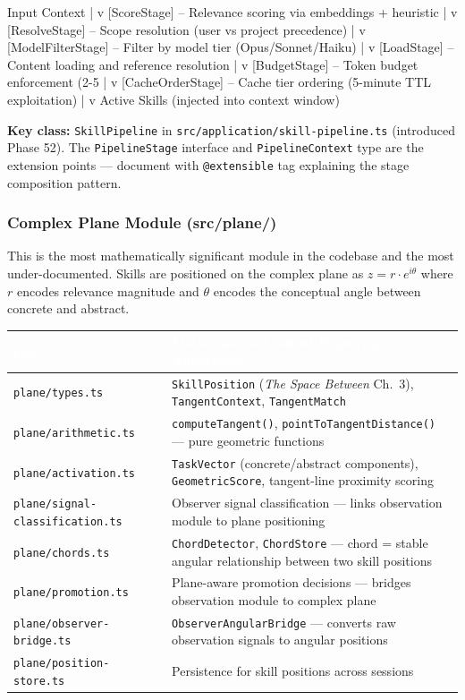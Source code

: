 \documentclass[11pt,letterpaper]{article}
\newcommand{\tableheader}[1]{\textbf{\sffamily\textcolor{white}{#1}}}
\begin{document}
\begin{asciibox}
Input Context
    |
    v [ScoreStage]       -- Relevance scoring via embeddings + heuristic
    |
    v [ResolveStage]     -- Scope resolution (user vs project precedence)
    |
    v [ModelFilterStage] -- Filter by model tier (Opus/Sonnet/Haiku)
    |
    v [LoadStage]        -- Content loading and reference resolution
    |
    v [BudgetStage]      -- Token budget enforcement (2-5%
    |
    v [CacheOrderStage]  -- Cache tier ordering (5-minute TTL exploitation)
    |
    v Active Skills (injected into context window)
\end{asciibox}

\textbf{Key class:} \texttt{SkillPipeline} in \texttt{src/application/skill-pipeline.ts} (introduced Phase 52). The \texttt{PipelineStage} interface and \texttt{PipelineContext} type are the extension points --- document with \texttt{@extensible} tag explaining the stage composition pattern.

\subsubsection{Complex Plane Module (src/plane/)}

This is the most mathematically significant module in the codebase and the most under-documented. Skills are positioned on the complex plane as $z = r \cdot e^{i\theta}$ where $r$ encodes relevance magnitude and $\theta$ encodes the conceptual angle between concrete and abstract.

\begin{center}
\begin{tabularx}{\textwidth}{L{4cm}X}
\toprule
{}
\tableheader{File} & \tableheader{Mathematical Content Requiring Annotation} \\
\midrule
\texttt{plane/types.ts} & \texttt{SkillPosition} (\textit{The Space Between} Ch.~3), \texttt{TangentContext}, \texttt{TangentMatch} \\
\texttt{plane/arithmetic.ts} & \texttt{computeTangent()}, \texttt{pointToTangentDistance()} --- pure geometric functions \\
\texttt{plane/activation.ts} & \texttt{TaskVector} (concrete/abstract components), \texttt{GeometricScore}, tangent-line proximity scoring \\
\texttt{plane/signal-classification.ts} & Observer signal classification --- links observation module to plane positioning \\
\texttt{plane/chords.ts} & \texttt{ChordDetector}, \texttt{ChordStore} --- chord = stable angular relationship between two skill positions \\
\texttt{plane/promotion.ts} & Plane-aware promotion decisions --- bridges observation module to complex plane \\
\texttt{plane/observer-bridge.ts} & \texttt{ObserverAngularBridge} --- converts raw observation signals to angular positions \\
\texttt{plane/position-store.ts} & Persistence for skill positions across sessions \\
\bottomrule
\end{tabularx}
\end{center}
\end{document}

